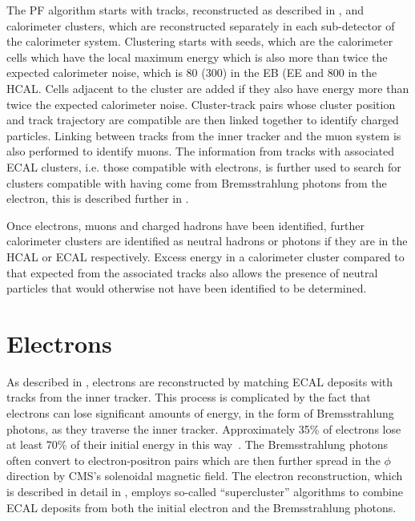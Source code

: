 The \ac{PF} algorithm starts with tracks, reconstructed as described in , and calorimeter clusters, which are reconstructed separately in each sub-detector of the calorimeter system. Clustering starts with seeds, which are the calorimeter cells which have the local maximum energy which is also more than twice the expected calorimeter noise, which is 80 (300) \MeV in the \ac{EB} (\ac{EE} and 800 \MeV in the \ac{HCAL}. Cells adjacent to the cluster are added if they also have energy more than twice the expected calorimeter noise. Cluster-track pairs whose cluster position and track trajectory are compatible are then linked together to identify charged particles. Linking between tracks from the inner tracker and the muon system is also performed to identify muons. The information from tracks with associated \ac{ECAL} clusters, i.e. those compatible with electrons, is further used to search for clusters compatible with having come from Bremsstrahlung photons from the electron, this is described further in .

Once electrons, muons and charged hadrons have been identified, further calorimeter clusters are identified as neutral hadrons or photons if they are in the \ac{HCAL} or \ac{ECAL} respectively. Excess energy in a calorimeter cluster compared to that expected from the associated tracks also allows the presence of neutral particles that would otherwise not have been identified to be determined.

\section{Electrons}
\label{sec:electrons}
As described in , electrons are reconstructed by matching \ac{ECAL} deposits with tracks from the inner tracker. This process is complicated by the fact that electrons can lose significant amounts of energy, in the form of Bremsstrahlung photons, as they traverse the inner tracker. Approximately 35\% of electrons lose at least 70\% of their initial energy in this way~\cite{Baffioni:2006cd}. The Bremsstrahlung photons often convert to electron-positron pairs which are then further spread in the $\phi$ direction by CMS's solenoidal magnetic field. The electron reconstruction, which is described in detail in , employs so-called ``supercluster'' algorithms to combine \ac{ECAL} deposits from both the initial electron and the Bremsstrahlung photons.

